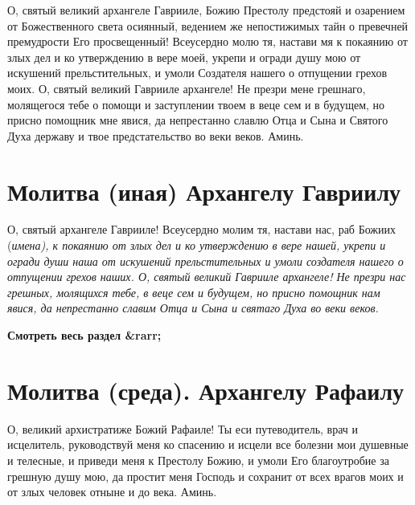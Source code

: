 О, святый великий архангеле Гаврииле, Божию Престолу предстояй и озарением от Божественного света осиянный, ведением же непостижимых тайн о превечней премудрости Его просвещенный! Всеусердно молю тя, настави мя к покаянию от злых дел и ко утверждению в вере моей, укрепи и огради душу мою от искушений прельстительных, и умоли Создателя нашего о отпущении грехов моих. О, святый великий Гаврииле архангеле! Не презри мене грешнаго, молящегося тебе о помощи и заступлении твоем в веце сем и в будущем, но присно помощник мне явися, да непрестанно славлю Отца и Сына и Святого Духа державу и твое предстательство во веки веков. Аминь.


\section{Молитва (иная) Архангелу Гавриилу}
 


О, святый архангеле Гаврииле! Всеусердно молим тя, настави нас, раб Божиих (\itshape имена\normalfont{}), к покаянию от злых дел и ко утверждению в вере нашей, укрепи и огради души наша от искушений прельстительных и умоли создателя нашего о отпущении грехов наших. О, святый великий Гаврииле архангеле! Не презри нас грешных, молящихся тебе, в веце сем и будущем, но присно помощник нам явися, да непрестанно славим Отца и Сына и святаго Духа во веки веков.


\mychapterending


\bfseries Смотреть весь раздел &rarr;\normalfont{} 

\section{Молитва (среда).     Архангелу Рафаилу}
 


О, великий архистратиже Божий Рафаиле! Ты еси путеводитель, врач и исцелитель, руководствуй меня ко спасению и исцели все болезни мои душевные и телесные, и приведи меня к Престолу Божию, и умоли Его благоутробие за грешную душу мою, да простит меня Господь и сохранит от всех врагов моих и от злых человек отныне и до века. Аминь.


\mychapterending


